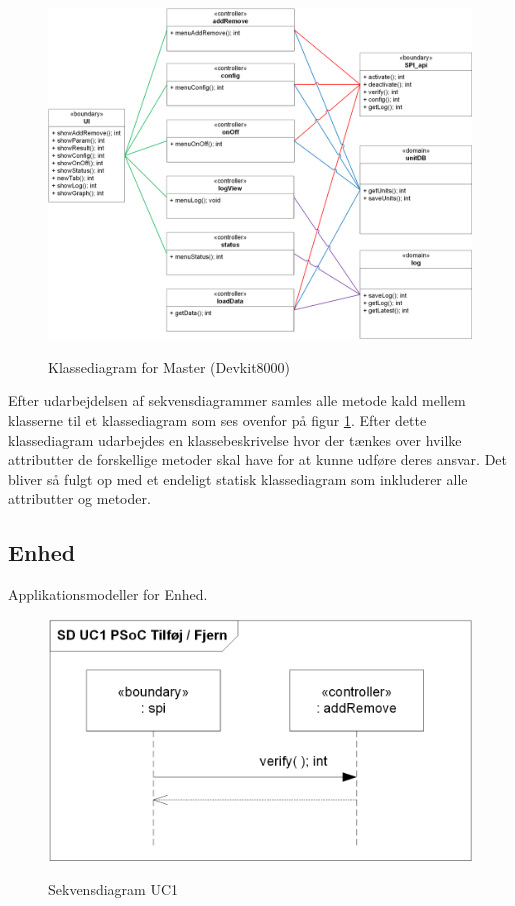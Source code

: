 \clearpage
\begin{figure}[htbp] \centering
{\includegraphics[width=\textwidth]{filer/design/sw_class_devkit}}
\caption{Klassediagram for Master (Devkit8000)}
\label{fig:klassediagram devkit8000}
\end{figure} 

Efter udarbejdelsen af sekvensdiagrammer samles alle metode kald mellem klasserne til et klassediagram som ses ovenfor på figur \ref{fig:klassediagram devkit8000}. Efter dette klassediagram udarbejdes en klassebeskrivelse hvor der tænkes over hvilke attributter de forskellige metoder skal have for at kunne udføre deres ansvar. Det bliver så fulgt op med et endeligt statisk klassediagram som inkluderer alle attributter og metoder.

\clearpage
\subsection{Enhed}
Applikationsmodeller for Enhed.

\begin{figure}[htbp] \centering
{\includegraphics[scale=1]{filer/design/a_psoc_uc1}}
\caption{Sekvensdiagram UC1}
\label{fig:psoc_sd_uc1}
\end{figure} 

